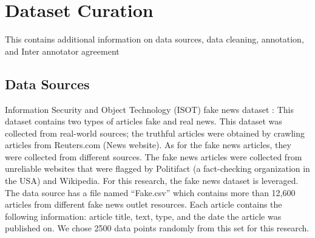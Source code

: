 \begin{comment}
\textcolor{red}{random------------}
\cite{ratliff2011behavioral} defines deception to be an outcome of omission and commission. To study deception using natural language processing techniques, in this research, we focus on omission because for ease of implementation. Referring to work on linking 5W (who, what, when, where, why) with semantic role labeling \cite{rani2023factify5wqa}, we study the omissions of these Ws and further use prompt engineering to augment deceptive data.


\textbf{Lies of commission} occur when someone takes the facts and embellishes them to produce an account of what never happened as it is typically more flattering. on the other hand, \textbf{lies of omission} occur when people generally leave out crucial information like facts from the victim. Thus the task of identifying such types of lies could be studied by identifying 5W(Who, What, When, Where, Why) and then finding missing ones. Therefore, we study omission in depth.


\end{comment}

\section{Dataset Curation}
This contains additional information on data sources, data cleaning, annotation, and Inter annotator agreement
\subsection{Data Sources}\label{sec:data sources}
Information Security and Object Technology (ISOT) fake news dataset \cite{ISOTFakeNewsDataset}: This dataset contains two types of articles fake and real news. This dataset was collected from real-world sources; the truthful articles were obtained by crawling articles from Reuters.com (News website). As for the fake news articles, they were collected from different sources. The fake news articles were collected from unreliable websites that were flagged by Politifact (a fact-checking organization in the USA) and Wikipedia. For this research, the fake news dataset is leveraged. The data source has a file named “Fake.csv” which contains more than 12,600 articles from different fake news outlet resources. Each article contains the following information: article title, text, type, and the date the article was published on. We chose 2500 data points randomly from this set for this research.


